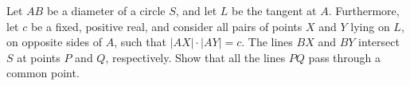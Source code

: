 Let $ AB$ be a diameter of a circle $ S$,  and let $ L$ be the tangent at $ A$. Furthermore, let $ c$ be a fixed, positive real, and consider all pairs of points $ X$ and $ Y$ lying on $ L$,  on opposite sides of $ A$,  such that $ |AX|\cdot |AY| = c$. The lines $ BX$ and $ BY$ intersect $ S$ at points $ P$ and $ Q$,  respectively. Show that all the lines $ PQ$ pass through a common point.